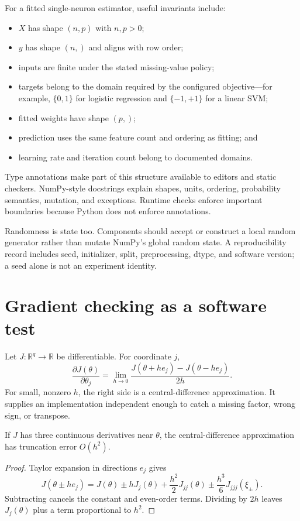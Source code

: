 For a fitted single-neuron estimator, useful invariants include:
\begin{itemize}
  \item $X$ has shape $(n,p)$ with $n,p>0$;
  \item $y$ has shape $(n,)$ and aligns with row order;
  \item inputs are finite under the stated missing-value policy;
  \item targets belong to the domain required by the configured objective---for
  example, $\{0,1\}$ for logistic regression and $\{-1,+1\}$ for a linear SVM;
  \item fitted weights have shape $(p,)$;
  \item prediction uses the same feature count and ordering as fitting; and
  \item learning rate and iteration count belong to documented domains.
\end{itemize}
Type annotations make part of this structure available to editors and static
checkers. NumPy-style docstrings explain shapes, units, ordering, probability
semantics, mutation, and exceptions. Runtime checks enforce important
boundaries because Python does not enforce annotations.

Randomness is state too. Components should accept or construct a local random
generator rather than mutate NumPy's global random state. A reproducibility
record includes seed, initializer, split, preprocessing, dtype, and software
version; a seed alone is not an experiment identity.

\section{Gradient checking as a software test}

Let $J:\mathbb R^q\to\mathbb R$ be differentiable. For coordinate $j$,
\[
  \frac{\partial J(\theta)}{\partial\theta_j}
  =
  \lim_{h\to0}
  \frac{J(\theta+he_j)-J(\theta-he_j)}{2h}.
\]
For small, nonzero $h$, the right side is a central-difference approximation.
It supplies an implementation independent enough to catch a missing factor,
wrong sign, or transpose.

\begin{proposition}
If $J$ has three continuous derivatives near $\theta$, the central-difference
approximation has truncation error $O(h^2)$.
\end{proposition}

\begin{proof}
Taylor expansion in directions $e_j$ gives
\[
J(\theta\pm he_j)
=J(\theta)\pm hJ_j(\theta)
+\frac{h^2}{2}J_{jj}(\theta)
\pm\frac{h^3}{6}J_{jjj}(\xi_\pm).
\]
Subtracting cancels the constant and even-order terms. Dividing by $2h$
leaves $J_j(\theta)$ plus a term proportional to $h^2$.
\end{proof}

